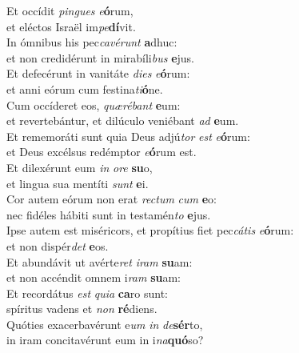\oddverse Et occídit \textit{pin}\textit{gues} \textit{e}\textbf{ó}rum,~\*\\
\oddverse et eléctos Israël im\textit{pe}\textbf{dí}vit.\\
\evenverse In ómnibus his pec\textit{ca}\textit{vé}\textit{runt} \textbf{a}dhuc:~\*\\
\evenverse et non credidérunt in mirabíli\textit{bus} \textbf{e}jus.\\
\oddverse Et defecérunt in vanitáte \textit{di}\textit{es} \textit{e}\textbf{ó}rum:~\*\\
\oddverse et anni eórum cum festina\textit{ti}\textbf{ó}ne.\\
\evenverse Cum occíderet eos, \textit{quæ}\textit{ré}\textit{bant} \textbf{e}um:~\*\\
\evenverse et revertebántur, et dilúculo veniébant \textit{ad} \textbf{e}um.\\
\oddverse Et rememoráti sunt quia Deus adjú\textit{tor} \textit{est} \textit{e}\textbf{ó}rum:~\*\\
\oddverse et Deus excélsus redémptor \textit{e}\textbf{ó}rum est.\\
\evenverse Et dilexérunt eum \textit{in} \textit{o}\textit{re} \textbf{su}o,~\*\\
\evenverse et lingua sua mentíti \textit{sunt} \textbf{e}i.\\
\oddverse Cor autem eórum non erat \textit{re}\textit{ctum} \textit{cum} \textbf{e}o:~\*\\
\oddverse nec fidéles hábiti sunt in testamén\textit{to} \textbf{e}jus.\\
\evenverse Ipse autem est miséricors, et propítius fiet pec\textit{cá}\textit{tis} \textit{e}\textbf{ó}rum:~\*\\
\evenverse et non dispér\textit{det} \textbf{e}os.\\
\oddverse Et abundávit ut avérte\textit{ret} \textit{i}\textit{ram} \textbf{su}am:~\*\\
\oddverse et non accéndit omnem i\textit{ram} \textbf{su}am:\\
\evenverse Et recordátus \textit{est} \textit{qui}\textit{a} \textbf{ca}ro sunt:~\*\\
\evenverse spíritus vadens et \textit{non} \textbf{ré}diens.\\
\oddverse Quóties exacerbavérunt e\textit{um} \textit{in} \textit{de}\textbf{sér}to,~\*\\
\oddverse in iram concitavérunt eum in i\textit{na}\textbf{quó}so?\\

